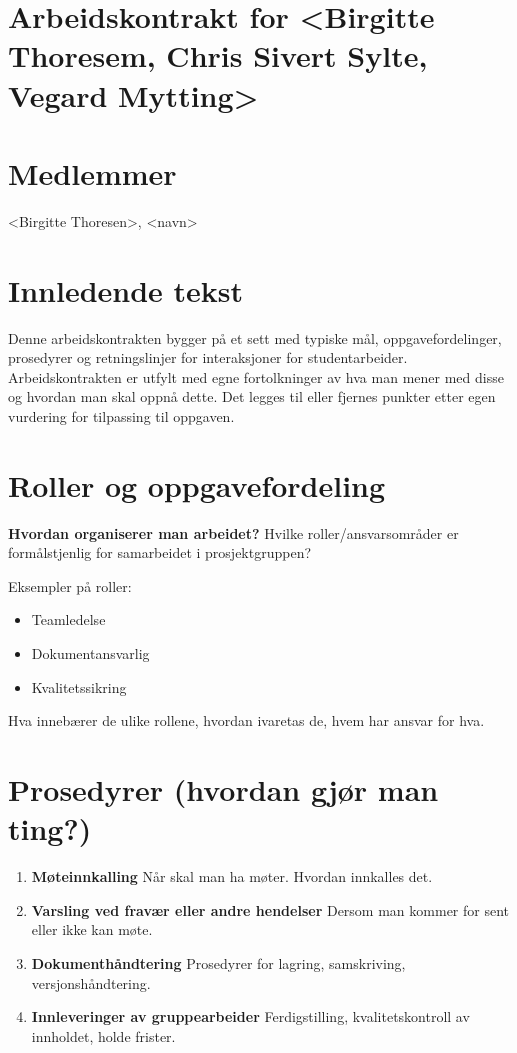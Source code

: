 \section{Arbeidskontrakt for \textless Birgitte Thoresem, Chris Sivert Sylte, Vegard Mytting\textgreater}

\section*{Medlemmer}
\textless Birgitte Thoresen\textgreater, \textless navn\textgreater

\section*{Innledende tekst}
Denne arbeidskontrakten bygger på et sett med typiske mål, oppgavefordelinger, prosedyrer og retningslinjer for interaksjoner for studentarbeider. Arbeidskontrakten er utfylt med egne fortolkninger av hva man mener med disse og hvordan man skal oppnå dette.  
Det legges til eller fjernes punkter etter egen vurdering for tilpassing til oppgaven.

\section*{Roller og oppgavefordeling}
\textbf{Hvordan organiserer man arbeidet?}  
Hvilke roller/ansvarsområder er formålstjenlig for samarbeidet i prosjektgruppen?  

Eksempler på roller:  
\begin{itemize}
    \item Teamledelse
    \item Dokumentansvarlig
    \item Kvalitetssikring
\end{itemize}

Hva innebærer de ulike rollene, hvordan ivaretas de, hvem har ansvar for hva.

\section*{Prosedyrer (hvordan gjør man ting?)}
\begin{enumerate}[label=\Alph*.]
    \item \textbf{Møteinnkalling}  
    Når skal man ha møter. Hvordan innkalles det.

    \item \textbf{Varsling ved fravær eller andre hendelser}  
    Dersom man kommer for sent eller ikke kan møte.

    \item \textbf{Dokumenthåndtering}  
    Prosedyrer for lagring, samskriving, versjonshåndtering.

    \item \textbf{Innleveringer av gruppearbeider}  
    Ferdigstilling, kvalitetskontroll av innholdet, holde frister.
\end{enumerate}


